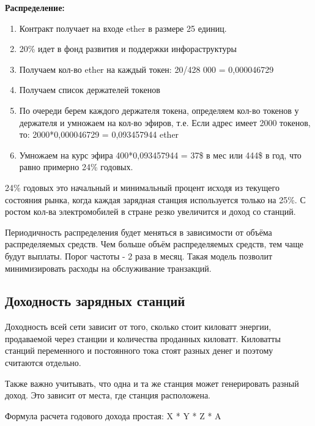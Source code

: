\documentclass[a4paper,12pt]{report}
\begin{document}
\textbf{Распределение:}

\begin{enumerate}
	\item Контракт получает на входе ether в размере 25 единиц.
	\item 20\% идет в фонд развития и поддержки инфораструктуры
	\item Получаем кол-во ether на каждый токен: 20/428 000 = 0,000046729
	\item Получаем список держателей токенов
	\item По очереди берем каждого держателя токена, определяем кол-во токенов у держателя и умножаем на кол-во эфиров, т.е. Если адрес имеет 2000 токенов, то: 2000*0,000046729 = 0,093457944 ether
	\item Умножаем на курс эфира 400*0,093457944 = 37\$ в мес или 444\$ в год, что равно примерно 24\% годовых. 
\end{enumerate}


24\% годовых это начальный и минимальный процент исходя из текущего состояния рынка, когда каждая зарядная станция используется только на 25\%. С ростом кол-ва электромобилей в стране резко увеличится и доход со станций.  

Периодичность распределения будет меняться в зависимости от объёма распределяемых средств. Чем больше объём распределяемых средств, тем чаще будут выплаты. Порог частоты - 2 раза в месяц. Такая модель позволит минимизировать расходы на обслуживание транзакций.

\subsection{Доходность зарядных станций}

Доходность всей сети зависит от того, сколько стоит киловатт энергии, продаваемой через станции и количества проданных киловатт. Киловатты станций переменного и постоянного тока стоят разных денег и поэтому считаются отдельно. 

Также важно учитывать, что одна и та же станция может генерировать разный доход. Это зависит от места, где станция расположена.

Формула расчета годового дохода простая: X * Y * Z * A 
\end{document}
